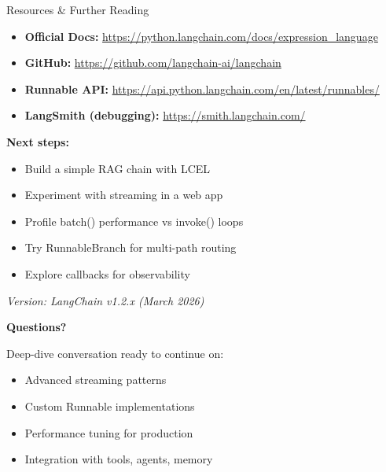 \documentclass[aspectratio=169,11pt]{beamer}
\begin{document}

\begin{frame}{Resources \& Further Reading}
  \begin{itemize}\setlength{\itemsep}{1pt}
    \item \textbf{Official Docs:} \url{https://python.langchain.com/docs/expression_language}
    \item \textbf{GitHub:} \url{https://github.com/langchain-ai/langchain}
    \item \textbf{Runnable API:} \url{https://api.python.langchain.com/en/latest/runnables/}
    \item \textbf{LangSmith (debugging):} \url{https://smith.langchain.com/}
  \end{itemize}

  \vspace{0.3em}
  \textbf{Next steps:}
  \begin{itemize}\setlength{\itemsep}{1pt}
    \item Build a simple RAG chain with LCEL
    \item Experiment with streaming in a web app
    \item Profile batch() performance vs invoke() loops
    \item Try RunnableBranch for multi-path routing
    \item Explore callbacks for observability
  \end{itemize}

  \vspace{0.3em}
  \small \textit{Version: LangChain v1.2.x (March 2026)}
\end{frame}

\begin{frame}
  \centering
  \Large \textbf{Questions?}

  \vspace{2em}
  \normalsize
  Deep-dive conversation ready to continue on:
  \begin{itemize}\setlength{\itemsep}{1pt}
    \item Advanced streaming patterns
    \item Custom Runnable implementations
    \item Performance tuning for production
    \item Integration with tools, agents, memory
  \end{itemize}
\end{frame}
\end{document}
